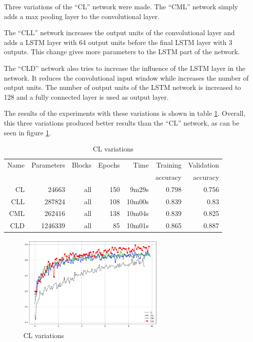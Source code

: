 
Three variations of the ``CL'' network were made.
The ``CML'' network simply adds a max pooling layer to the convolutional layer.

The ``CLL'' network increases the output units of the convolutional layer and adds a LSTM layer with 64 output units before the final LSTM layer with 3 outputs. This change gives more parameters to the LSTM part of the network.

The ``CLD'' network also tries to increase the influence of the LSTM layer in the network. It reduces the convolutional input window while increases the number of output units. The number of output units of the LSTM network is increased to 128 and a fully connected layer is used as output layer.

The results of the experiments with these variations is shown in table \ref{tab:carvingclvariations}.
Overall, this three variations produced better results than the ``CL'' network, as can be seen in figure \ref{fig:cl-variations}.

\begin{table}[!ht]
    \centering
    \caption{CL variations}
    \label{tab:carvingclvariations}
\begin{tabular}{r|r|r|r|r|r|r}
\hline
Name & Parameters & Blocks & Epochs & Time    & Training          & Validation          \\       
     &            &        &        &         &          accuracy &            accuracy \\ \hline\hline

CL	    & 24663	    & all	& 150	& 9m29s	    & 0.798	& 0.756 \\\hline
CLL	    & 287824	& all	& 108	& 10m00s	& 0.839	& 0.83 \\\hline
CML	    & 262416	& all	& 138	& 10m04s	& 0.839	& 0.825 \\\hline
CLD	    & 1246339	& all	& 85	& 10m01s	& 0.865	& 0.887 \\\hline
\end{tabular}
\end{table}

\begin{figure}[htb!]
\centering\includegraphics[width=0.65\textwidth]{content/cl-variations.png}
\caption{\label{fig:cl-variations}CL variations}%
\end{figure}

